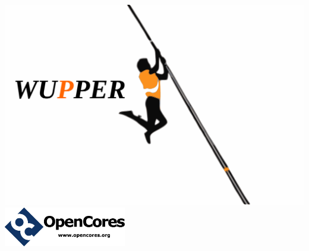 \begin{titlepage}
	\maketitle
	\thispagestyle{titlepage}
	\begin{center}
	\vspace{2cm}
	\includegraphics[width=1\textwidth]{figures/random_wupper_orange.pdf} \\
	\vspace{4cm}
	\includegraphics[width=0.4\textwidth]{figures/oclogo.jpg} 	
	\end{center}
\end{titlepage}
\newpage